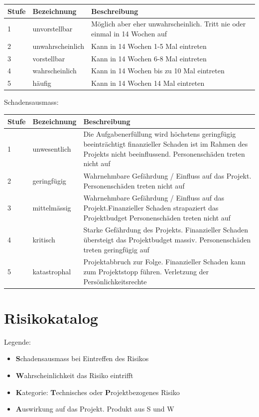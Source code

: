 \documentclass[a4paper]{report}
\begin{document}
\vspace{1em}
\noindent
\begin{tabular}{|p{}|p{}|p{}|}
	\hline
	\textbf{Stufe} & \textbf{Bezeichnung} & \textbf{Beschreibung} \\
	\hline
	1 & unvorstellbar & Möglich aber eher unwahrscheinlich. Tritt nie oder einmal in 14 Wochen auf \\
	\hline
	2 & unwahrscheinlich & Kann in 14 Wochen 1-5 Mal eintreten\\
	\hline
	3 & vorstellbar & Kann in 14 Wochen 6-8 Mal eintreten \\
	\hline
	4 & wahrscheinlich & Kann in 14 Wochen bis zu 10 Mal eintreten \\
	\hline
	5 & häufig & Kann in 14 Wochen 14 Mal eintreten\\
	\hline
\end{tabular}

\vspace{1em}
\noindent
Schadensausmass:

\vspace{1em}
\noindent
\begin{tabular}{|p{}|p{}|p{}|}
	\hline
	\textbf{Stufe} & \textbf{Bezeichnung} & \textbf{Beschreibung} \\
	\hline
	1 & unwesentlich & Die Aufgabenerfüllung wird höchstens geringfügig beeinträchtigt finanzieller Schaden ist im Rahmen des Projekts nicht beeinflussend. Personenschäden treten nicht auf \\
	\hline
	2 & geringfügig & Wahrnehmbare Gefährdung / Einfluss auf das Projekt. Personenschäden treten nicht auf \\
	\hline
	3 & mittelmässig & Wahrnehmbare Gefährdung / Einfluss auf das Projekt.Finanzieller Schaden strapaziert das Projektbudget
	Personenschäden treten nicht auf \\
	\hline
	4 & kritisch & Starke Gefährdung des Projekts. Finanzieller Schaden übersteigt das Projektbudget massiv. Personenschäden treten geringfügig auf \\
	\hline
	5 & katastrophal & Projektabbruch zur Folge. Finanzieller Schaden kann zum Projektstopp führen. Verletzung der Persönlichkeitsrechte
	\\
	\hline
\end{tabular}


\section{Risikokatalog}
\label{sec:Risikokatalog}
Legende:
\begin{itemize}
	\item \textbf{S}chadensausmass bei Eintreffen des Risikos
	\item \textbf{W}ahrscheinlichkeit das Risiko eintrifft
	\item \textbf{K}ategorie: \textbf{T}echnisches oder \textbf{P}rojektbezogenes Risiko
	\item \textbf{A}uswirkung auf das Projekt. Produkt aus S und W
\end{itemize}
\end{document}
